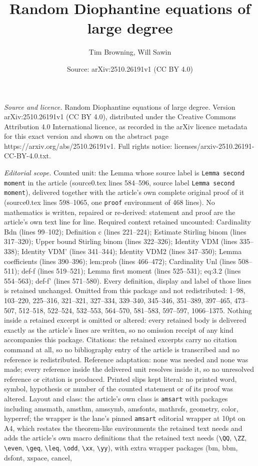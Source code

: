 \documentclass[10pt,a4paper]{amsart}
\title[Random Diophantine equations of large degree]{Random Diophantine equations of large degree}
\author{Tim Browning, Will Sawin}
\date{Source: arXiv:2510.26191v1 (CC BY 4.0)}
\begin{document}
\maketitle

\noindent\emph{Source and licence.} Random Diophantine equations of large degree. Version arXiv:2510.26191v1 (CC BY 4.0), distributed under the Creative Commons Attribution 4.0 International licence, as recorded in the arXiv licence metadata for this exact version and shown on the abstract page https://arxiv.org/abs/2510.26191v1. Full rights notice: licenses/arxiv-2510.26191-CC-BY-4.0.txt.\par\smallskip

\noindent\textit{Editorial scope.} Counted unit: the Lemma whose source label is \texttt{Lemma second moment} in the article (source0.tex lines 584--596, source label \texttt{Lemma second moment}), delivered together with the article's own complete original proof of it (source0.tex lines 598--1065, one \texttt{proof} environment of 468 lines). No mathematics is written, repaired or re-derived: statement and proof are the article's own text line for line. Required context retained uncounted: Cardinality Bdn (lines 99--102); Definition c (lines 221--224); Estimate Stirling binom (lines 317--320); Upper bound Stirling binom (lines 322--326); Identity VDM (lines 335--338); Identity VDM' (lines 341--344); Identity VDM2 (lines 347--350); Lemma coefficients (lines 390--396); lem:prob (lines 466--472); Cardinality Unl (lines 508--511); def-f (lines 519--521); Lemma first moment (lines 525--531); eq:3.2 (lines 554--563); def-f' (lines 571--580). Every definition, display and label of those lines is retained unchanged. Omitted from this package and not redistributed: 1--98, 103--220, 225--316, 321--321, 327--334, 339--340, 345--346, 351--389, 397--465, 473--507, 512--518, 522--524, 532--553, 564--570, 581--583, 597--597, 1066--1375. Nothing inside a retained excerpt is omitted or altered: every retained body is delivered exactly as the article's lines are written, so no omission receipt of any kind accompanies this package. Citations: the retained excerpts carry no citation command at all, so no bibliography entry of the article is transcribed and no reference is redistributed. Reference adaptation: none was needed and none was made; every reference inside the delivered unit resolves inside it, so no unresolved reference or citation is produced. Printed slips kept literal: no printed word, symbol, hypothesis or number of the counted statement or of its proof was altered. Layout and class: the article's own class is \texttt{amsart} with packages including amsmath, amsthm, amssymb, amsfonts, mathrsfs, geometry, color, hyperref; the wrapper is the lane's pinned \texttt{amsart} editorial wrapper at 10pt on A4, which restates the theorem-like environments the retained text needs and adds the article's own macro definitions that the retained text needs (\texttt{\textbackslash QQ}, \texttt{\textbackslash ZZ}, \texttt{\textbackslash even}, \texttt{\textbackslash geq}, \texttt{\textbackslash leq}, \texttt{\textbackslash odd}, \texttt{\textbackslash xx}, \texttt{\textbackslash yy}), with extra wrapper packages (bm, bbm, dsfont, xspace, cancel, 
\end{document}
